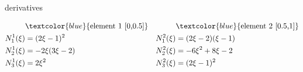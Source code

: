 \documentclass{beamer}
\begin{document}
\begin{frame}[allowframebreaks]
\begin{minipage}[b]{0.48\linewidth}
    \centering \footnotesize{derivatives}
  \end{minipage}
  \begin{equation}\nonumber
    \begin{aligned}
       & \textcolor{blue}{\text{element 1 [0,0.5]}}  & & \textcolor{blue}{\text{element 2 [0.5,1]}} \\
      N_1^1(\xi) &=  (2 \xi -1)^2 & N_1^2(\xi) &= (2\xi-2)(\xi-1)  \\
      N_2^1(\xi) &= -2\xi(3\xi-2) &N_2^2(\xi) &= -6\xi^2 + 8\xi -2 \\
      N_3^1(\xi) &=  2\xi^2       & N_3^2(\xi) &= (2\xi -1)^2 \\
    \end{aligned}
  \end{equation}
  
  \newpage

\end{frame}

\end{document}
